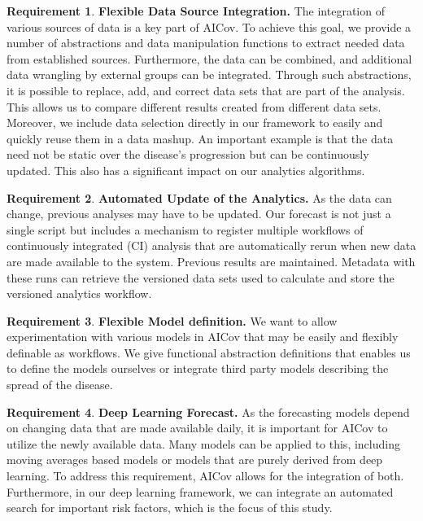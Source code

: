 \documentclass[12pt]{article}
\theoremstyle{definition}
\newtheorem{requirement}{Requirement}
\renewcommand{\_}{%
    \textunderscore\hspace{0pt}%
}
\begin{document}
\begin{requirement}{\bf Flexible Data Source Integration.} The integration of various sources of data is a key part of AICov. \Solution To achieve this goal, we provide a number of abstractions and data manipulation functions to extract needed data from established sources. Furthermore, the data can be combined, and additional data wrangling by external groups can be integrated.
Through such abstractions, it is possible to replace, add, and correct data sets that are part of the analysis. This allows us to compare different results created from different data sets. Moreover, we include data selection directly in our framework to easily and quickly reuse them in a data mashup. An important example is that the data need not be static over the disease's progression but can be continuously updated. This also has a significant impact on our analytics algorithms.
\end{requirement}

\begin{requirement}{\bf Automated Update of the Analytics.} As the data can change, previous analyses may have to be updated. \Solution Our forecast is not just a single script but includes a mechanism to register multiple workflows of continuously integrated (CI) analysis that are automatically rerun when new data are made available to the system. Previous results are maintained. Metadata with these runs can retrieve the versioned data sets used to calculate and store the versioned analytics workflow.
\end{requirement}

\begin{requirement}{\bf Flexible Model definition.} We want to allow experimentation with various models in AICov that may be easily and flexibly definable as workflows. \Solution We give functional abstraction definitions that enables us to define the models ourselves or integrate third party models describing the spread of the disease. 
\end{requirement}

\begin{requirement}{\bf Deep Learning Forecast.} As the forecasting models depend on changing data that are made available daily, it is important for AICov to utilize the newly available data. Many models can be applied to this, including moving averages based models or models that are purely derived from deep learning. \Solution To address this requirement, AICov allows for the integration of both. Furthermore, in our deep learning framework, we can  integrate an automated search for important risk factors, which is the focus of this study.
\end{requirement}
\end{document}

